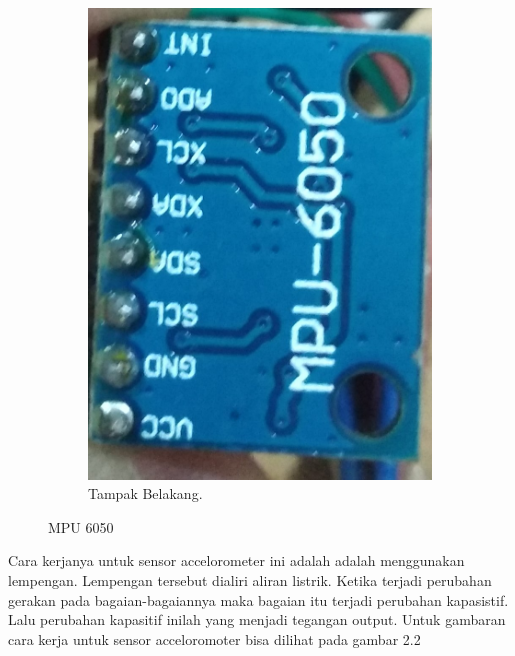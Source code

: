 \documentclass[11pt]{article}
\begin{document}
\begin{figure}[h!]
\begin{subfigure}[b]{0.35\linewidth}
		\includegraphics[width=\linewidth]{dokumentasi/MPU6050/mpu60501_1.jpg}
		\caption{Tampak Belakang.}
	\end{subfigure}
	\caption{MPU 6050}
	\label{fig:MPU 6050}
\end{figure}
Cara kerjanya untuk sensor accelorometer ini adalah  adalah menggunakan lempengan.
Lempengan tersebut dialiri aliran listrik.
Ketika terjadi perubahan gerakan pada bagaian-bagaiannya maka bagaian itu terjadi perubahan kapasistif.
Lalu perubahan kapasitif inilah yang menjadi tegangan output.
Untuk gambaran cara kerja untuk sensor acceloromoter bisa dilihat pada gambar 2.2
\end{document}
